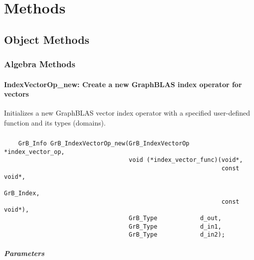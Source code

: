 \chapter{Methods}
\section{Object Methods}
\subsection{Algebra Methods}

\subsubsection{{\sf IndexVectorOp\_new}: Create a new GraphBLAS index operator for vectors}


Initializes a new GraphBLAS vector index operator with a specified user-defined 
function and its types (domains).

\paragraph{\syntax}

\begin{verbatim}
    GrB_Info GrB_IndexVectorOp_new(GrB_IndexVectorOp  *index_vector_op,
                                   void (*index_vector_func)(void*,
                                                             const void*,
                                                             GrB_Index,
                                                             const void*),
                                   GrB_Type            d_out,
                                   GrB_Type            d_in1,
                                   GrB_Type            d_in2);
\end{verbatim}

\paragraph{Parameters}

